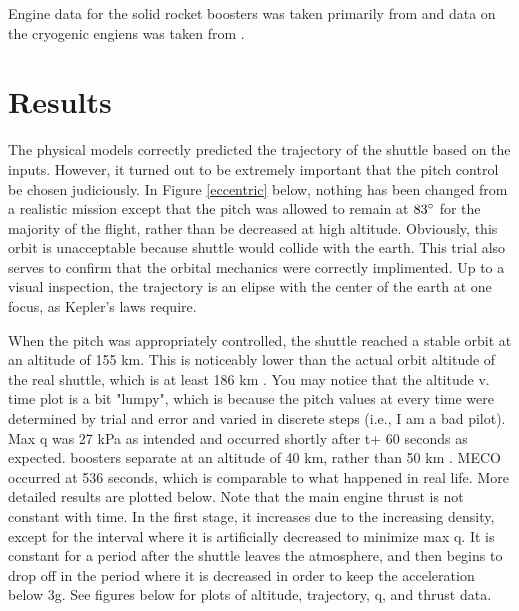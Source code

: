 \documentclass{article}
\begin{document}
Engine data for the solid rocket boosters was taken primarily from \cite{srb} and data on the cryogenic engiens was taken from \cite{rs}.

\section{Results}

The physical models correctly predicted the trajectory of the shuttle based on the inputs. However, it turned out to be extremely important
that the pitch control be chosen judiciously. In Figure \ref{eccentric} below, nothing has been changed from a realistic mission except
that the pitch was allowed to remain at $83 \degree$ for the majority of the flight, rather than be decreased at high altitude. Obviously,
this orbit is unacceptable because shuttle would collide with the earth. This trial
also serves to confirm that the orbital mechanics were correctly implimented. Up to a visual inspection, the trajectory is an elipse with
the center of the earth at one focus, as Kepler's laws require.

When the pitch was appropriately controlled, the shuttle reached a stable orbit at an altitude of 155 km. This is noticeably lower than the
actual orbit altitude of the real shuttle, which is at least 186 km \cite{ksc}. You may notice that the altitude v. time plot is a bit
"lumpy", which is because the pitch values at every time were determined by trial and error and varied in discrete steps (i.e., I am a bad
pilot). Max q was 27 kPa as intended
and occurred shortly after t+ 60 seconds as expected. boosters separate at an altitude of 40 km, rather than 50 km \cite{ksc}. MECO occurred
at 536 seconds, which is comparable to what happened in real life. More detailed results are plotted below. Note that the main engine thrust
is not constant with time. In the first stage, it increases due to the increasing density, except for the interval where it is artificially
decreased to minimize max q. It is constant for a period after the shuttle leaves the atmosphere, and then begins to drop off in the period
where it is decreased in order to keep the acceleration below 3g. See figures below for plots of altitude, trajectory, q, and thrust data.
\end{document}
